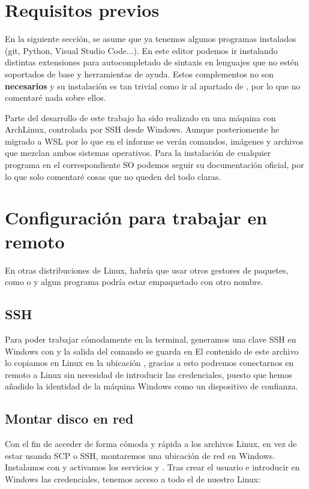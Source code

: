 \section{Requisitos previos}
En la siguiente sección, se asume que ya tenemos algunos programas instalados (git, Python,  Visual Studio Code...). En este editor podemos ir instalando distintas extensiones para autocompletado de sintaxis en lenguajes que no estén soportados de base y herramientas de ayuda. Estos complementos no son \textbf{necesarios} y su instalación es tan trivial como ir al apartado de , por lo que no comentaré nada sobre ellos.

Parte del desarrollo de este trabajo ha sido realizado en una máquina con ArchLinux, controlada por SSH desde Windows. Aunque posteriomente he migrado a WSL\cite{wsl} por lo que en el informe se verán comandos, imágenes y archivos que mezclan ambos sistemas operativos. Para la instalación de cualquier programa en el correspondiente SO podemos seguir su documentación oficial, por lo que solo comentaré cosas que no queden del todo claras.\par

\section{Configuración para trabajar en remoto}
\hr
En otras distribuciones de Linux, habría que usar otros gestores de paquetes, como  o  y algun programa podría estar empaquetado con otro nombre.
\hr

    \subsection{SSH}
    Para poder trabajar cómodamente en la terminal, generamos una clave SSH en Windows con  y la salida del comando se guarda en  \newline
    El contenido de este archivo lo copiamos en Linux en la ubicación , gracias a esto podremos conectarnos en remoto a Linux sin necesidad de introducir las credenciales, puesto que hemos añadido la identidad de la máquina Windows como un dispositivo de confianza.


    \subsection{Montar disco en red}
    Con el fin de acceder de forma cómoda y rápida a los archivos Linux, en vez de estar usando SCP o SSH, montaremos una ubicación de red en Windows. Instalamos con  y activamos los servicios  y . Tras crear el usuario e introducir en Windows las credenciales, tenemos acceso a todo el  de nuestro Linux:


